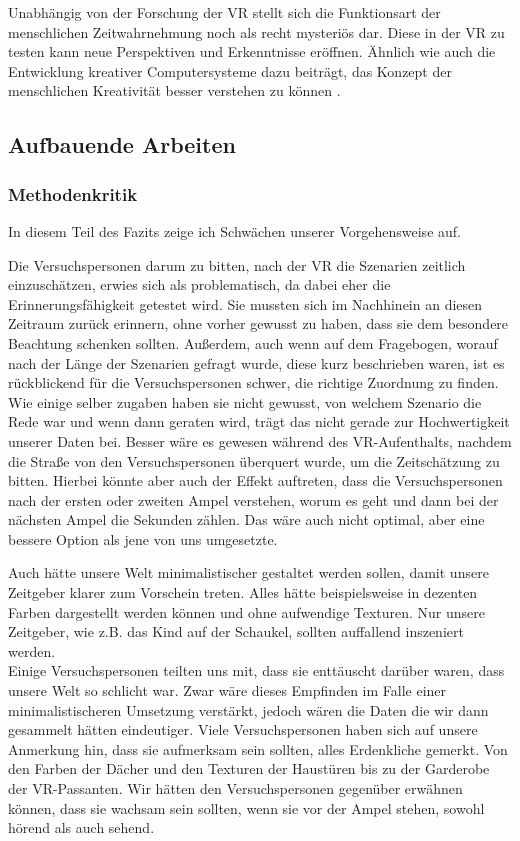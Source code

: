 \documentclass{Bericht}
\begin{document}
Unabhängig von der Forschung der VR stellt sich die Funktionsart der menschlichen Zeitwahrnehmung noch als recht mysteriös dar\cite{unerforscht}. Diese in der VR zu testen kann neue Perspektiven und Erkenntnisse eröffnen. Ähnlich wie auch die Entwicklung kreativer Computersysteme dazu beiträgt, das Konzept der menschlichen Kreativität besser verstehen zu können \cite{comp}.

\subsection{Aufbauende Arbeiten}
\subsubsection{Methodenkritik}
In diesem Teil des Fazits zeige ich Schwächen unserer Vorgehensweise auf.

Die Versuchspersonen darum zu bitten, nach der VR die Szenarien zeitlich einzuschätzen, erwies sich als problematisch, da dabei eher die Erinnerungsfähigkeit getestet wird. Sie mussten sich im Nachhinein an diesen Zeitraum zurück erinnern, ohne vorher gewusst zu haben, dass sie dem besondere Beachtung schenken sollten. Außerdem, auch wenn auf dem Fragebogen, worauf nach der Länge der Szenarien gefragt wurde, diese kurz beschrieben waren, ist es rückblickend für die Versuchspersonen schwer, die richtige Zuordnung zu finden. Wie einige selber zugaben haben sie nicht gewusst, von welchem Szenario die Rede war und wenn dann geraten wird, trägt das nicht gerade zur Hochwertigkeit unserer Daten bei. Besser wäre es gewesen während des VR-Aufenthalts, nachdem die Straße von den Versuchspersonen überquert wurde, um die Zeitschätzung zu bitten. Hierbei könnte aber auch der Effekt auftreten, dass die Versuchspersonen nach der ersten oder zweiten Ampel verstehen, worum es geht und dann bei der nächsten Ampel die Sekunden zählen. Das wäre auch nicht optimal, aber eine bessere Option als jene von uns umgesetzte.

Auch hätte unsere Welt minimalistischer gestaltet werden sollen, damit unsere Zeitgeber klarer zum Vorschein treten. Alles hätte beispielsweise in dezenten Farben dargestellt werden können und ohne aufwendige Texturen. Nur unsere Zeitgeber, wie z.B. das Kind auf der Schaukel, sollten auffallend inszeniert werden. \\Einige Versuchspersonen teilten uns mit, dass sie enttäuscht darüber waren, dass unsere Welt so schlicht war. Zwar wäre dieses Empfinden im Falle einer minimalistischeren Umsetzung verstärkt, jedoch wären die Daten die wir dann gesammelt hätten eindeutiger. Viele Versuchspersonen haben sich auf unsere Anmerkung hin, dass sie aufmerksam sein sollten, alles Erdenkliche gemerkt. Von den Farben der Dächer und den Texturen der Haustüren bis zu der Garderobe der VR-Passanten. Wir hätten den Versuchspersonen gegenüber erwähnen können, dass sie wachsam sein sollten, wenn sie vor der Ampel stehen, sowohl hörend als auch sehend.
\end{document}
